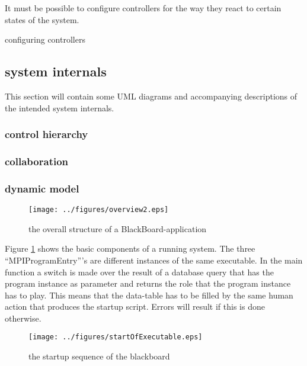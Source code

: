 \documentclass[]{lofar}
\begin{document}
        \begin{requirement}
          It must be possible to configure controllers for the way
          they react to certain states of the system.
          \footnotemark[\value{footnote}]
          \caption{configuring controllers\label{req:configure-controllers}}
        \end{requirement}

    \subsection{system internals}

      This section will contain some UML diagrams and accompanying
      descriptions of the intended system internals.

      \subsubsection{control hierarchy}

      \subsubsection{collaboration}

      \subsubsection{dynamic model}

        \begin{figure}
          \texttt{[image: ../figures/overview2.eps]}
          \hypertarget{fig:overview2}{}
          \caption{the overall structure of a BlackBoard-application\label{fig:overview2}}
        \end{figure}

        Figure \hyperlink{fig:overview2}{\ref{fig:overview2}} shows
        the basic components of a running system. The three
        ``MPIProgramEntry'''s are different instances of the same
        executable. In the main function a switch is made over the
        result of a database query that has the program instance as
        parameter and returns the role that the program instance has
        to play. This means that the data-table has to be filled by
        the same human action that produces the startup script. Errors
        will result if this is done otherwise.

        \begin{figure}
          \texttt{[image: ../figures/startOfExecutable.eps]}
          \hypertarget{fig:startOfExecutable}{}
          \caption{the startup sequence of the blackboard{\label{fig:startOfExecutable}}}
        \end{figure}
\end{document}
